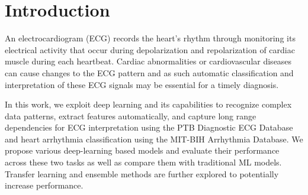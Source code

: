 \section{Introduction}
\label{sec:introduction}
An electrocardiogram (ECG) records the heart's rhythm through monitoring its electrical activity that occur during depolarization and repolarization of cardiac muscle during each heartbeat. 
Cardiac abnormalities or cardiovascular diseases can cause changes to the ECG pattern and as such automatic classification and interpretation of these ECG signals may be essential for a timely diagnosis.

In this work, we exploit deep learning and its capabilities to recognize complex data patterns, extract features automatically, and capture long range dependencies for ECG interpretation using the PTB Diagnostic ECG Database and heart arrhythmia classification using the MIT-BIH Arrhythmia Database. We propose various deep-learning based models and evaluate their performance across these two tasks as well as compare them with traditional ML models. Transfer learning and ensemble methods are further explored to potentially increase performance.


